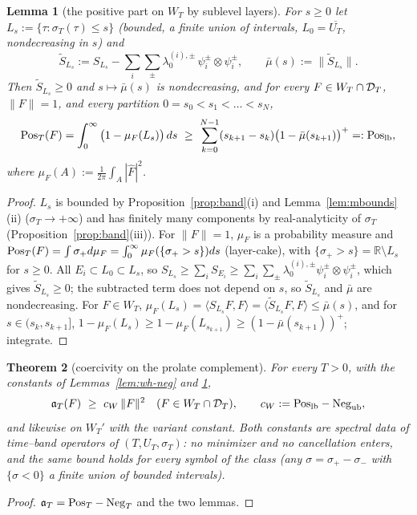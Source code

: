 \documentclass[11pt]{amsart}
\newtheorem{theorem}{Theorem}[section]
\newtheorem{lemma}[theorem]{Lemma}
\theoremstyle{definition}
\theoremstyle{remark}
\newcommand{\R}{\mathbb R}
\newcommand{\sT}{\sigma_T}
\newcommand{\Fh}{\widehat F}
\begin{document}
\begin{lemma}[the positive part on $W_T$ by sublevel layers]\label{lem:wh-pos}
For $s\ge0$ let $L_s:=\{\tau:\sT(\tau)\le s\}$ (bounded, a finite union of intervals, $L_0=\overline{U_T}$, nondecreasing in $s$) and
\[
\widetilde S_{L_s}:=S_{L_s}-\sum_i\sum_\pm\lambda_0^{(i),\pm}\,\psi_i^\pm\otimes\psi_i^\pm,\qquad \bar\mu(s):=\|\widetilde S_{L_s}\| .
\]
Then $\widetilde S_{L_s}\ge0$ and $s\mapsto\bar\mu(s)$ is nondecreasing, and for every $F\in W_T\cap\mathcal D_T$, $\|F\|=1$, and every
partition $0=s_0<s_1<\dots<s_N$,
\[
\Pos(F)=\int_0^\infty\big(1-\mu_F(L_s)\big)\,ds\ \ge\ \sum_{k=0}^{N-1}(s_{k+1}-s_k)\big(1-\bar\mu(s_{k+1})\big)^+=:\mathrm{Pos}_{\mathrm{lb}},
\]
where $\mu_F(A):=\frac1{2\pi}\int_A|\Fh|^2$.
\end{lemma}
\begin{proof}
$L_s$ is bounded by Proposition~\ref{prop:band}(i) and Lemma~\ref{lem:mbounds}(ii) ($\sT\to+\infty$) and has finitely many
components by real-analyticity of $\sT$ (Proposition~\ref{prop:band}(iii)). For $\|F\|=1$, $\mu_F$ is a probability measure
and $\mathrm{Pos}_T(F)=\int\sigma_+d\mu_F=\int_0^\infty\mu_F(\{\sigma_+>s\})ds$ (layer-cake), with $\{\sigma_+>s\}=\R\setminus L_s$ for
$s\ge0$. All $E_i\subset L_0\subset L_s$, so $S_{L_s}\ge\sum_iS_{E_i}\ge\sum_i\sum_\pm\lambda_0^{(i),\pm}\psi_i^\pm\otimes\psi_i^\pm$,
which gives $\widetilde S_{L_s}\ge0$; the subtracted term does not depend on $s$, so $\widetilde S_{L_s}$ and $\bar\mu$ are nondecreasing.
For $F\in W_T$, $\mu_F(L_s)=\langle S_{L_s}F,F\rangle=\langle\widetilde S_{L_s}F,F\rangle\le\bar\mu(s)$, and for $s\in(s_k,s_{k+1}]$,
$1-\mu_F(L_s)\ge1-\mu_F(L_{s_{k+1}})\ge(1-\bar\mu(s_{k+1}))^+$; integrate.
\end{proof}

\begin{theorem}[coercivity on the prolate complement]\label{thm:wh-LW}
For every $T>0$, with the constants of Lemmas~\ref{lem:wh-neg} and \ref{lem:wh-pos},
\[
\fa(F)\ \ge\ c_W\,\|F\|^2\quad(F\in W_T\cap\DT),\qquad c_W:=\mathrm{Pos}_{\mathrm{lb}}-\mathrm{Neg}_{\mathrm{ub}} ,
\]
and likewise on $W_T'$ with the variant constant. Both constants are spectral data of time--band operators of
$(T,U_T,\sT)$: no minimizer and no cancellation enters, and the same bound holds for every symbol of the class
(any $\sigma=\sigma_+-\sigma_-$ with $\{\sigma<0\}$ a finite union of bounded intervals).
\end{theorem}
\begin{proof}
$\mathfrak a_T=\mathrm{Pos}_T-\mathrm{Neg}_T$ and the two lemmas.
\end{proof}
\end{document}
